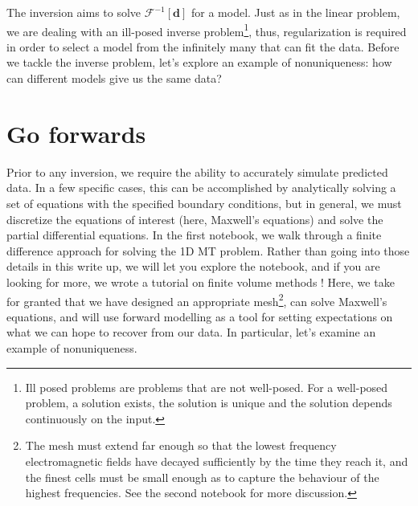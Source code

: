 \documentclass[11pt,oneside]{article}
\begin{document}
The inversion aims to solve $\mathcal{F}^{-1}[\mathbf{d}]$ for a model. Just as in the linear problem, we are dealing with an ill-posed inverse problem\footnote{Ill posed problems are problems that are not well-posed. For a well-posed problem, a solution exists, the solution is unique and the solution depends continuously on the input.}, thus, regularization is required in order to select a model from the infinitely many that can fit the data. Before we tackle the inverse problem, let's explore an example of nonuniqueness: how can different models give us the same data?

\section{Go forwards}
Prior to any inversion, we require the ability to accurately simulate predicted data. In a few specific cases, this can be accomplished by analytically solving a set of equations with the specified boundary conditions, but in general, we must discretize the equations of interest (here, Maxwell’s equations) and solve the partial differential equations. In the first notebook, we walk through a finite difference approach for solving the 1D MT problem. Rather than going into those details in this write up, we will let you explore the notebook, and if you are looking for more, we wrote a tutorial on finite volume methods \citep{Cockett2016}! Here, we take for granted that we have designed an appropriate mesh\footnote{The mesh must extend far enough so that the lowest frequency electromagnetic fields have decayed sufficiently by the time they reach it, and the finest cells must be small enough as to capture the behaviour of the highest frequencies. See the second notebook for more discussion.}, can solve Maxwell’s equations, and will use forward modelling as a tool for setting expectations on what we can hope to recover from our data. In particular, let’s examine an example of nonuniqueness.
\end{document}
